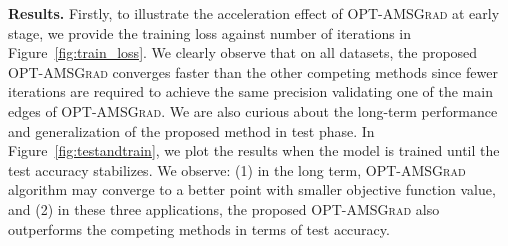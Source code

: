 \documentclass[11pt]{article}
\theoremstyle{k}
\begin{document}
\textbf{Results.} 
Firstly, to illustrate the acceleration effect of \textsc{OPT-AMSGrad} at early stage, we provide the training loss against number of iterations in Figure~\ref{fig:train_loss}. 
We clearly observe that on all datasets, the proposed \textsc{OPT-AMSGrad} converges faster than the other competing methods since fewer iterations are required to achieve the same precision validating one of the main edges of \textsc{OPT-AMSGrad}.
We are also curious about the long-term performance and generalization of the proposed method in test phase.
In Figure~\ref{fig:testandtrain}, we plot the results when the model is trained until the test accuracy stabilizes. 
We observe: \textsf{(1)} in the long term, \textsc{OPT-AMSGrad} algorithm may converge to a better point with smaller objective function value, and \textsf{(2)} in these three applications, the proposed \textsc{OPT-AMSGrad} also outperforms the competing methods in terms of test accuracy. \vspace{-0.1in}
\end{document}
